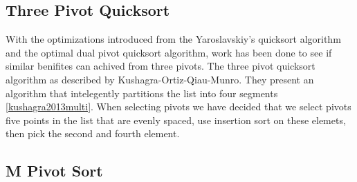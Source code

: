 	\subsection{Three Pivot Quicksort}	
		\label{subsec:ThreePivotQSortIntro}	
		With the optimizations introduced from the Yaroslavskiy's quicksort algorithm and the optimal dual pivot quicksort algorithm, work has been done to see if similar benifites can achived from three pivots. The three pivot quicksort algorithm as described by Kushagra-Ortiz-Qiau-Munro. They present an algorithm that intelegently partitions the list into four segments \ref{kushagra2013multi}. When selecting pivots we have decided that we select pivots five points in the list that are evenly spaced, use insertion sort on these elemets, then pick the second and fourth element.
		
	\subsection{M Pivot Sort}	
		\label{subsec:MPivotQSortIntro}
		
